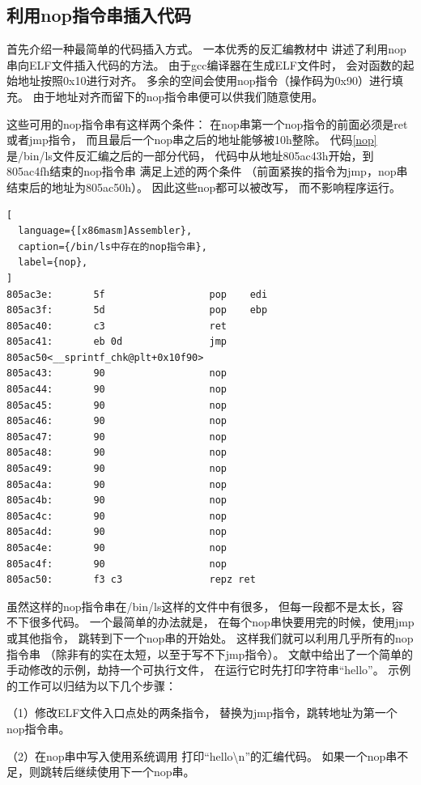 \subsection{利用nop指令串插入代码}
\label{nopinjection}

首先介绍一种最简单的代码插入方式。
一本优秀的反汇编教材\cite{heike}中
讲述了利用nop串向ELF文件插入代码的方法。
由于gcc编译器在生成ELF文件时，
会对函数的起始地址按照0x10进行对齐。
多余的空间会使用nop指令（操作码为0x90）进行填充。
由于地址对齐而留下的nop指令串便可以供我们随意使用。

这些可用的nop指令串有这样两个条件：
在nop串第一个nop指令的前面必须是ret或者jmp指令，
而且最后一个nop串之后的地址能够被10h整除。
代码\ref{nop}是/bin/ls文件反汇编之后的一部分代码，
代码中从地址805ac43h开始，到805ac4fh结束的nop指令串
满足上述的两个条件
（前面紧挨的指令为jmp，nop串结束后的地址为805ac50h）。
因此这些nop都可以被改写，
而不影响程序运行。

\begin{lstlisting}[
  language={[x86masm]Assembler},
  caption={/bin/ls中存在的nop指令串},
  label={nop},
]
805ac3e:       5f                  pop    edi
805ac3f:       5d                  pop    ebp
805ac40:       c3                  ret
805ac41:       eb 0d               jmp    805ac50<__sprintf_chk@plt+0x10f90>
805ac43:       90                  nop
805ac44:       90                  nop
805ac45:       90                  nop
805ac46:       90                  nop
805ac47:       90                  nop
805ac48:       90                  nop
805ac49:       90                  nop
805ac4a:       90                  nop
805ac4b:       90                  nop
805ac4c:       90                  nop
805ac4d:       90                  nop
805ac4e:       90                  nop
805ac4f:       90                  nop
805ac50:       f3 c3               repz ret
\end{lstlisting}

虽然这样的nop指令串在/bin/ls这样的文件中有很多，
但每一段都不是太长，容不下很多代码。
一个最简单的办法就是，
在每个nop串快要用完的时候，使用jmp或其他指令，
跳转到下一个nop串的开始处。
这样我们就可以利用几乎所有的nop指令串
（除非有的实在太短，以至于写不下jmp指令）。
文献\cite{heike}中给出了一个简单的手动修改的示例，劫持一个可执行文件，
在运行它时先打印字符串“hello”。
示例的工作可以归结为以下几个步骤：

（1）修改ELF文件入口点处的两条指令，
替换为jmp指令，跳转地址为第一个nop指令串。

（2）在nop串中写入使用系统调用
打印“hello\textbackslash n”的汇编代码。
如果一个nop串不足，则跳转后继续使用下一个nop串。

